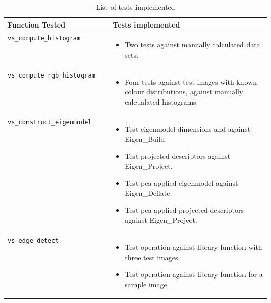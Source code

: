 \begin{appendices}
\begin{table}[h]
	\centering
	\caption{List of tests implemented}
	\label{tbl:list-of-tests}
	\begin{tabular}{ l p{0.6\linewidth} }
		\toprule
		\bfseries Function Tested & \bfseries Tests implemented \\
		\midrule
		\texttt{vs\_compute\_histogram} &
		\begin{minipage}[t]{\linewidth}
			\begin{itemize}[leftmargin=*]
				\item Two tests against manually calculated data sets.
			\end{itemize}
		\end{minipage} \\
%		
		\texttt{vs\_compute\_rgb\_histogram} &
		\begin{minipage}[t]{\linewidth}
			\begin{itemize}[leftmargin=*]
				\item Four tests against test images with known colour distributions, against manually calcualated histograms.
			\end{itemize}
		\end{minipage} \\
%		
		\texttt{vs\_construct\_eigenmodel} &
		\begin{minipage}[t]{\linewidth}
			\begin{itemize}[leftmargin=*]
				\item Test eigenmodel dimensions and against Eigen\_Build.
				\item Test projected descriptors against Eigen\_Project.
				\item Test \gls{pca} applied eigenmodel against Eigen\_Deflate.
				\item Test \gls{pca} applied projected descriptors against Eigen\_Project.
			\end{itemize}
		\end{minipage} \\
%		
		\texttt{vs\_edge\_detect} &
		\begin{minipage}[t]{\linewidth}
			\begin{itemize}[leftmargin=*]
				\item Test operation against library function with three test images.
				\item Test operation against library function for a sample image.
			\end{itemize}
		\end{minipage} \\

\end{tabular}
\end{table}
\end{appendices}
